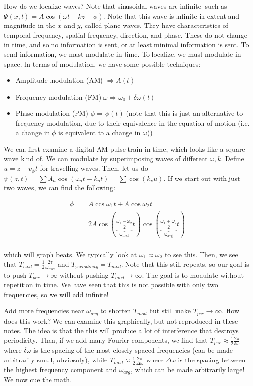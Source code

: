 \documentclass{report}
\begin{document}
How do we localize waves? Note that sinusoidal waves are infinite, such as $\Psi(x,t) = A \cos(\omega t - kz + \phi)$. Note that this wave is infinite in extent and magnitude in the $x$ and $y$, called plane waves. They have characteristics of temporal frequency, spatial frequency, direction, and phase. These do not change in time, and so no information is sent, or at least minimal information is sent. To send information, we must modulate in time. To localize, we must modulate in space. In terms of modulation, we have some possible techniques:

\begin{itemize}
\item Amplitude modulation (AM) $\Rightarrow A(t)$
\item Frequency modulation (FM) $\omega \Rightarrow \omega_0 + \delta\omega(t)$
\item Phase modulation (PM) $\phi \Rightarrow \phi(t)$ (note that this is just an alternative to frequency modulation, due to their equivalence in the equation of motion (i.e. a change in $\phi$ is equivalent to a change in $\omega$))
\end{itemize}

We can first examine a digital AM pulse train in time, which looks like a square wave kind of. We can modulate by superimposing waves of different $\omega,k$. Define $u = z - v_\phi t$ for travelling waves. Then, let us do $\psi(z,t) = \sum{A_n \cos(\omega_nt-k_nt)} = \sum{\cos(k_nu)}$. If we start out with just two waves, we can find the following:

\begin{align*}
\phi &= A\cos\omega_1t + A\cos\omega_2t\\
&= 2A\cos\left(\underbrace{\frac{\omega_1 - \omega_2}{2}}_{\mathrm{\omega_{mod}}}t\right)\cos\left(\underbrace{\frac{\omega_1 + \omega_2}{2}}_\mathrm{\omega_{avg}}t\right)\\
\end{align*}

which will graph beats. We typically look at $\omega_1 \approx \omega_2$ to see this. Then, we see that $T_{mod} = \frac{1}{2} \frac{2\pi}{\omega_{mod}}$ and $T_{periodicity} = T_{mod}$. Note that this still repeats, so our goal is to push $T_{per} \to \infty$ without pushing $T_{mod} \to\infty$. The goal is to modulate without repetition in time. We have seen that this is not possible with only two frequencies, so we will add infinite!

Add more frequencies near $\omega_{avg}$ to shorten $T_{mod}$ but still make $T_{per} \to\infty$. How does this work? We can examine this graphically, but not reproduced in these notes. The idea is that the this will produce a lot of interference that destroys periodicity. Then, if we add many Fourier components, we find that $T_{per} \approx \frac{1}{2}\frac{2\pi}{\delta\omega}$ where $\delta\omega$ is the spacing of the most closely spaced frequencies (can be made arbitrarily small, obviosuly), while $T_{mod} \approx \frac{1}{2}\frac{2\pi}{\Delta\omega}$ where $\Delta\omega$ is the spacing between the highest frequency component and $\omega_{avg}$, which can be made arbitrarily large! We now cue the math.
\end{document}
